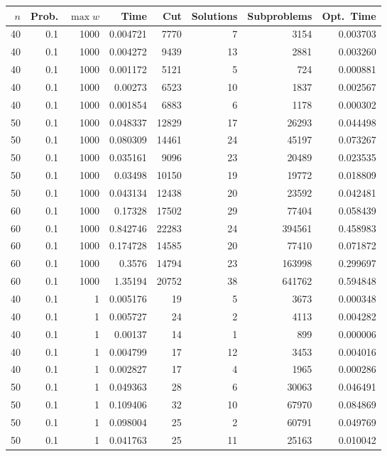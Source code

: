 \documentclass[a4paper,11pt]{article}
\begin{document}
\begin{table}
\begin{center}
\begin{tabular}{|rrr|r|r|rr|r|}
\hline
$n$ & Prob. & $\max w$ & Time & Cut & Solutions & Subproblems & Opt.\ Time \\
\hline
40 & 0.1 & 1000 & 0.004721 & 7770 & 7 & 3154 & 0.003703 \\
40 & 0.1 & 1000 & 0.004272 & 9439 & 13 & 2881 & 0.003260 \\
40 & 0.1 & 1000 & 0.001172 & 5121 & 5 & 724 & 0.000881 \\
40 & 0.1 & 1000 & 0.00273 & 6523 & 10 & 1837 & 0.002567 \\
40 & 0.1 & 1000 & 0.001854 & 6883 & 6 & 1178 & 0.000302 \\
50 & 0.1 & 1000 & 0.048337 & 12829 & 17 & 26293 & 0.044498 \\
50 & 0.1 & 1000 & 0.080309 & 14461 & 24 & 45197 & 0.073267 \\
50 & 0.1 & 1000 & 0.035161 & 9096 & 23 & 20489 & 0.023535 \\
50 & 0.1 & 1000 & 0.03498 & 10150 & 19 & 19772 & 0.018809 \\
50 & 0.1 & 1000 & 0.043134 & 12438 & 20 & 23592 & 0.042481 \\
60 & 0.1 & 1000 & 0.17328 & 17502 & 29 & 77404 & 0.058439 \\
60 & 0.1 & 1000 & 0.842746 & 22283 & 24 & 394561 & 0.458983 \\
60 & 0.1 & 1000 & 0.174728 & 14585 & 20 & 77410 & 0.071872 \\
60 & 0.1 & 1000 & 0.3576 & 14794 & 23 & 163998 & 0.299697 \\
60 & 0.1 & 1000 & 1.35194 & 20752 & 38 & 641762 & 0.594848 \\
\hline
40 & 0.1 & 1 & 0.005176 & 19 & 5 & 3673 & 0.000348 \\
40 & 0.1 & 1 & 0.005727 & 24 & 2 & 4113 & 0.004282 \\
40 & 0.1 & 1 & 0.00137 & 14 & 1 & 899 & 0.000006 \\
40 & 0.1 & 1 & 0.004799 & 17 & 12 & 3453 & 0.004016 \\
40 & 0.1 & 1 & 0.002827 & 17 & 4 & 1965 & 0.000286 \\
50 & 0.1 & 1 & 0.049363 & 28 & 6 & 30063 & 0.046491 \\
50 & 0.1 & 1 & 0.109406 & 32 & 10 & 67970 & 0.084869 \\
50 & 0.1 & 1 & 0.098004 & 25 & 2 & 60791 & 0.049769 \\
50 & 0.1 & 1 & 0.041763 & 25 & 11 & 25163 & 0.010042 \\

\end{tabular}
\end{center}
\end{table}
\end{document}
